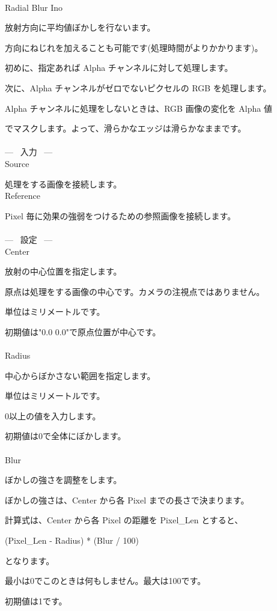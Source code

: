 \documentclass[a4paper,12pt]{article}
\begin{document}
\thispagestyle{empty}

\Large
\noindent \\
Radial Blur Ino\medskip
\par
\normalsize
放射方向に平均値ぼかしを行ないます。\par
方向にねじれを加えることも可能です(処理時間がよりかかります)。\\
\par
初めに、指定あれば Alpha チャンネルに対して処理します。\par
次に、Alpha チャンネルがゼロでないピクセルの RGB を処理します。\par
Alpha チャンネルに処理をしないときは、RGB 画像の変化を Alpha 値\par
でマスクします。よって、滑らかなエッジは滑らかなままです。\\
\\
--- \ 入力 \ ---\\
Source\par
処理をする画像を接続します。\\
Reference\par
Pixel 毎に効果の強弱をつけるための参照画像を接続します。\\
\\
--- \ 設定 \ ---\\
Center\par
放射の中心位置を指定します。\par
原点は処理をする画像の中心です。カメラの注視点ではありません。\par
単位はミリメートルです。\par
初期値は"0.0 0.0"で原点位置が中心です。\\
\\
Radius\par
中心からぼかさない範囲を指定します。\par
単位はミリメートルです。\par
0以上の値を入力します。\par
初期値は0で全体にぼかします。\\
\\
Blur\par
ぼかしの強さを調整をします。\par
ぼかしの強さは、Center から各 Pixel までの長さで決まります。\par
計算式は、Center から各 Pixel の距離を Pixel\_Len とすると、\par
(Pixel\_Len - Radius) * (Blur / 100)\par
となります。\par
最小は0でこのときは何もしません。最大は100です。\par
初期値は1です。
\end{document}
